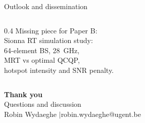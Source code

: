 \begin{frame}{Outlook and dissemination}
\begin{columns}[T]
\begin{column}{0.4\textwidth}
      \vspace{8pt}
      Missing piece for Paper B:\\
      {\footnotesize
        Sionna RT simulation study:\\
        64-element BS, \SI{28}{\giga\hertz},\\
        MRT vs optimal QCQP,\\
        hotspot intensity and SNR penalty.
      }
    \end{column}
  \end{columns}
\end{frame}

\begin{frame}

  \vfill
  \begin{center}
    {\Large\color{navyblue}\bfseries Thank you}\\[12pt]
    {\normalsize Questions and discussion}\\[16pt]
    {\footnotesize Robin Wydaeghe \quad$\mid$\quad robin.wydaeghe@ugent.be}
  \end{center}
  \vfill
\end{frame}
